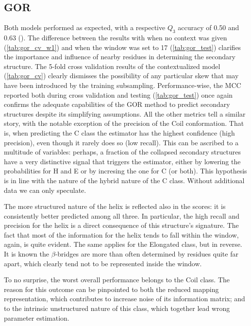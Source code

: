 \documentclass[nocrop]{bioinfo}
\begin{document}
\subsection*{GOR}
Both models performed as expected, with a respective $Q_3$ accuracy of 0.50 and 0.63 ().
The difference between the results with when no context was given (\autoref{tab:gor_cv_w1}) and when the window was set to 17 (\autoref{tab:gor_test})  clarifies the importance and influence of nearby residues in determining the secondary structure.
The 5-fold cross validation results of the contextualized model (\autoref{tab:gor_cv}) clearly dismisses the possibility of any particular skew that may have been introduced by the training subsampling. 
Performance-wise, the MCC reported both during cross validation and testing (\autoref{tab:gor_test}) once again confirms the adequate capabilities of the GOR method to predict secondary structures despite its simplifying assumptions.
All the other metrics tell a similar story, with the notable exception of the precision of the Coil conformation.
That is, when predicting the C class the estimator has the highest confidence (high precision), even though it rarely does so (low recall).
This can be ascribed to a multitude of variables: perhaps, a fraction of the collapsed secondary structures have a very distinctive signal that triggers the estimator, either by lowering the probabilities for H and E or by incresing the one for C (or both).
This hypothesis is in line with the nature of the hybrid nature of the C class.
Without additional data we can only speculate.

The more structured nature of the helix is reflected also in the scores: it is consistently better predicted among all three.
In particular, the high recall and precision for the helix is a direct consequence of this structure's signature.
The fact that most of the information for the helix tends to fall within the window, again, is quite evident.
The same applies for the Elongated class, but in reverse.
It is known the $\beta$-bridges are more than often determined by residues quite far apart, which clearly tend not to be represented inside the window.

To no surprise, the worst overall performance belongs to the Coil class.
The reason for this outcome can be pinpointed to both the reduced mapping representation, which contributes to increase noise of its information matrix; and to the intrinsic unstructured nature of this class, which together lead wrong parameter estimation.
\end{document}
